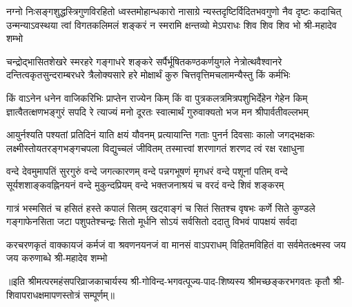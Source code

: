 \fourlineindentedshloka
{नग्नो निःसङ्गशुद्धस्त्रिगुणविरहितो ध्वस्तमोहान्धकारो}
{नासाग्रे न्यस्तदृष्टिर्विदितभवगुणो नैव दृष्टः कदाचित्}
{उन्मन्याऽवस्थया त्वां विगतकलिमलं शङ्करं न स्मरामि}
{क्षन्तव्यो मेऽपराधः शिव शिव शिव भो श्री-महादेव शम्भो} %

\fourlineindentedshloka
{चन्द्रोद्भासितशेखरे स्मरहरे गङ्गाधरे शङ्करे}
{सर्पैर्भूषितकण्ठकर्णयुगले नेत्रोत्थवैश्वानरे}
{दन्तित्वकृतसुन्दराम्बरधरे त्रैलोक्यसारे हरे}
{मोक्षार्थं कुरु चित्तवृत्तिमचलामन्यैस्तु किं कर्मभिः} %


\fourlineindentedshloka
{किं वाऽनेन धनेन वाजिकरिभिः प्राप्तेन राज्येन किम्}
{किं वा पुत्रकलत्रमित्रपशुभिर्देहेन गेहेन किम्}
{ज्ञात्वैतत्क्षणभङ्गुरं सपदि रे त्याज्यं मनो दूरतः}
{स्वात्मार्थं गुरुवाक्यतो भज मन श्रीपार्वतीवल्लभम्} %

\fourlineindentedshloka
{आयुर्नश्यति पश्यतां प्रतिदिनं याति क्षयं यौवनम्}
{प्रत्यायान्ति गताः पुनर्न दिवसाः कालो जगद्भक्षकः}
{लक्ष्मीस्तोयतरङ्गभङ्गचपला विद्युच्चलं जीवितम्}
{तस्मात्त्वां शरणागतं शरणद त्वं रक्ष रक्षाधुना} %


\fourlineindentedshloka
{वन्दे देवमुमापतिं सुरगुरुं वन्दे जगत्कारणम्}
{वन्दे पन्नगभूषणं मृगधरं वन्दे पशूनां पतिम्}
{वन्दे सूर्यशशाङ्कवह्निनयनं वन्दे मुकुन्दप्रियम्}
{वन्दे भक्तजनाश्रयं च वरदं वन्दे शिवं शङ्करम्} %

\fourlineindentedshloka
{गात्रं भस्मसितं च हसितं हस्ते कपालं सितम्}
{खट्वाङ्गं च सितं सितश्च वृषभः कर्णे सिते कुण्डले}
{गङ्गाफेनसिता जटा पशुपतेश्चन्द्रः सितो मूर्धनि}
{सोऽयं सर्वसितो ददातु विभवं पापक्षयं सर्वदा} %

\fourlineindentedshloka
{करचरणकृतं वाक्कायजं कर्मजं वा}
{श्रवणनयनजं वा मानसं वाऽपराधम्}
{विहितमविहितं वा सर्वमेतत्क्ष्मस्व}
{जय जय करुणाब्धे श्री-महादेव शम्भो} %


॥इति श्रीमत्परमहंसपरिव्राजकाचार्यस्य श्री-गोविन्द-भगवत्पूज्य-पाद-शिष्यस्य 
श्रीमच्छङ्करभगवतः कृतौ श्री-शिवापराधक्षमापणस्तोत्रं सम्पूर्णम्॥
\setlength{\shlokaspaceskip}{24pt}